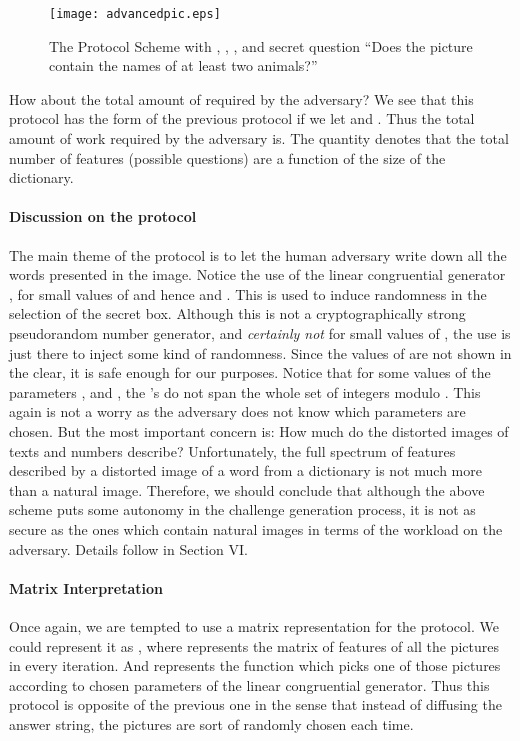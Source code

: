 \documentclass{llncs}
\begin{document}
\begin{figure}[ht]
\centerline{\texttt{[image: advancedpic.eps]}}
\caption{The Protocol Scheme with , , ,  and secret question ``Does the picture contain the names of at least two animals?''}
\label{fig7}
\end{figure}
How about the total amount of required by the adversary? We see that this protocol has the form of the previous protocol if we let  and . Thus the total amount of work required by the adversary is. The quantity  denotes that the total number of features (possible questions) are a function of the size  of the dictionary. 
\paragraph*{Discussion on the protocol} The main theme of the protocol is to let the human adversary write down all the words presented in the image. Notice the use of the linear congruential generator , for small values of  and hence  and . This is used to induce randomness in the selection of the secret box. Although this is not a cryptographically strong pseudorandom number generator, and \textit{certainly not} for small values of , the use is just there to inject some kind of randomness. Since the values of  are not shown in the clear, it is safe enough for our purposes. Notice that for some values of the parameters ,  and , the 's do not span the whole set of integers modulo . This again is not a worry as the adversary does not know which parameters are chosen. But the most important concern is: How much do the distorted images of texts and numbers describe? Unfortunately, the full spectrum of features described by a distorted image of a word from a dictionary is not much more than a natural image. Therefore, we should conclude that although the above scheme puts some autonomy in the challenge generation process, it is not as secure as the ones which contain natural images in terms of the workload on the adversary. Details follow in Section VI.
\paragraph*{Matrix Interpretation} Once again, we are tempted to use a matrix representation for the protocol. We could represent it as , where  represents the matrix of features of all the  pictures in every iteration. And  represents the function which picks one of those  pictures according to chosen parameters of the linear congruential generator. Thus this protocol is opposite of the previous one in the sense that instead of diffusing the answer string, the pictures are sort of randomly chosen each time.  
\end{document}
